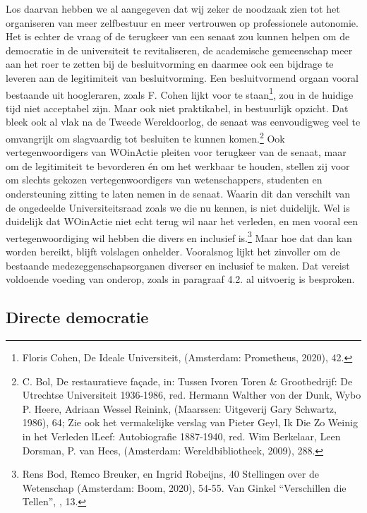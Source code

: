 \documentclass[empirical, authordate, ]{new-jote-article}
\begin{document}
	Los daarvan hebben we al aangegeven dat wij zeker de noodzaak zien tot het organiseren van meer zelfbestuur en meer vertrouwen op professionele autonomie. Het is echter de vraag of de terugkeer van een senaat zou kunnen helpen om de democratie in de universiteit te revitaliseren, de academische gemeenschap meer aan het roer te zetten bij de besluitvorming en daarmee ook een bijdrage te leveren aan de legitimiteit van besluitvorming. Een besluitvormend orgaan vooral bestaande uit hoogleraren, zoals F. Cohen lijkt voor te staan\footnote{Floris Cohen, De Ideale Universiteit, (Amsterdam: Prometheus, 2020), 42.}, zou in de huidige tijd niet acceptabel zijn. Maar ook niet praktikabel, in bestuurlijk opzicht. Dat bleek ook al vlak na de Tweede Wereldoorlog, de senaat was eenvoudigweg veel te omvangrijk om slagvaardig tot besluiten te kunnen komen.\footnote{C. Bol, De restauratieve façade, in: Tussen Ivoren Toren \& Grootbedrijf: De Utrechtse Universiteit 1936-1986, red. Hermann Walther von der Dunk, Wybo P. Heere, Adriaan Wessel Reinink, (Maarssen: Uitgeverij Gary Schwartz, 1986), 64; Zie ook het vermakelijke verslag van Pieter Geyl, Ik Die Zo Weinig in het Verleden lLeef: Autobiografie 1887-1940, red. Wim Berkelaar, Leen Dorsman, P. van Hees, (Amsterdam: Wereldbibliotheek, 2009), 288.} Ook vertegenwoordigers van WOinActie pleiten voor terugkeer van de senaat, maar om de legitimiteit te bevorderen én om het werkbaar te houden, stellen zij voor om slechts gekozen vertegenwoordigers van wetenschappers, studenten en ondersteuning zitting te laten nemen in de senaat. Waarin dit dan verschilt van de ongedeelde Universiteitsraad zoals we die nu kennen, is niet duidelijk. Wel is duidelijk dat WOinActie niet echt terug wil naar het verleden, en men vooral een vertegenwoordiging wil hebben die divers en inclusief is.\footnote{Rens Bod, Remco Breuker, en Ingrid Robeijns, 40 Stellingen over de Wetenschap (Amsterdam: Boom, 2020), 54-55. Van Ginkel “Verschillen die Tellen”, , 13.} Maar hoe dat dan kan worden bereikt, blijft volslagen onhelder. Vooralsnog lijkt het zinvoller om de bestaande medezeggenschapsorganen diverser en inclusief te maken. Dat vereist voldoende voeding van onderop, zoals in paragraaf 4.2. al uitvoerig is besproken.



	\subsection{Directe democratie}
\end{document}
